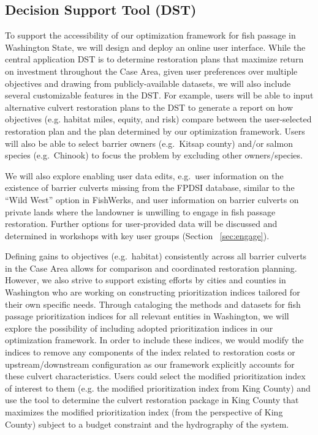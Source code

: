 \documentclass[12pt]{elsarticle}
\begin{document}
\subsection*{Decision Support Tool (DST)}

To support the accessibility of our optimization framework for fish passage in Washington State, we will design and deploy an online user interface. While the central application DST is to determine restoration plans that maximize return on investment throughout the Case Area, given user preferences over multiple objectives and drawing from publicly-available datasets, we will also include several customizable features in the DST. For example, users will be able to input alternative culvert restoration plans to the DST to generate a report on how objectives (e.g. habitat miles, equity, and risk) compare between the user-selected restoration plan and the plan determined by our optimization framework. Users will also be able to select barrier owners (e.g.\ Kitsap county) and/or salmon species (e.g.\ Chinook) to focus the problem by excluding other owners/species. 

We will also explore enabling user data edits, e.g.\ user information on the existence of barrier culverts missing from the FPDSI database, similar to the ``Wild West'' option in FishWerks, and user information on barrier culverts on private lands where the landowner is unwilling to engage in fish passage restoration. Further options for user-provided data will be discussed and determined in workshops with key user groups (Section ~\ref{sec:engage}).

Defining gains to objectives (e.g.\ habitat) consistently across all barrier culverts in the Case Area allows for comparison and coordinated restoration planning. However, we also strive to support existing efforts by cities and counties in Washington who are working on constructing prioritization indices tailored for their own specific needs. Through cataloging the methods and datasets for fish passage prioritization indices for all relevant entities in Washington, we will explore the possibility of including adopted prioritization indices in our optimization framework. In order to include these indices, we would modify the indices to remove any components of the index related to restoration costs or upstream/downstream configuration as our framework explicitly accounts for these culvert characteristics. Users could select the modified prioritization index of interest to them (e.g. the modified prioritization index from King County) and use the tool to determine the culvert restoration package in King County that maximizes the modified prioritization index (from the perspective of King County) subject to a budget constraint and the hydrography of the system.
\end{document}
